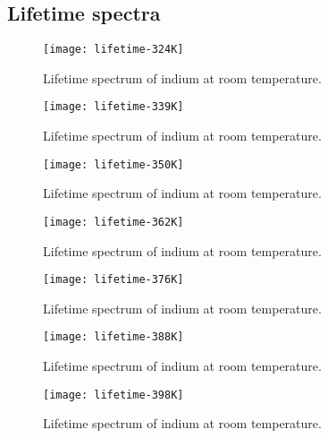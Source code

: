 \documentclass[11pt, english, fleqn, DIV=15, headinclude, BCOR=2cm]{scrreprt}
\begin{document}
\begin{appendix}

    \chapter{Lifetime spectra}

    \begin{figure}
        \centering
        \texttt{[image: lifetime-324K]}
        \caption{%
            Lifetime spectrum of indium at room temperature.
        }
        \label{fig:lifetime-324K}
    \end{figure}

    \begin{figure}
        \centering
        \texttt{[image: lifetime-339K]}
        \caption{%
            Lifetime spectrum of indium at room temperature.
        }
        \label{fig:lifetime-339K}
    \end{figure}

    \begin{figure}
        \centering
        \texttt{[image: lifetime-350K]}
        \caption{%
            Lifetime spectrum of indium at room temperature.
        }
        \label{fig:lifetime-350K}
    \end{figure}

    \begin{figure}
        \centering
        \texttt{[image: lifetime-362K]}
        \caption{%
            Lifetime spectrum of indium at room temperature.
        }
        \label{fig:lifetime-362K}
    \end{figure}

    \begin{figure}
        \centering
        \texttt{[image: lifetime-376K]}
        \caption{%
            Lifetime spectrum of indium at room temperature.
        }
        \label{fig:lifetime-376K}
    \end{figure}

    \begin{figure}
        \centering
        \texttt{[image: lifetime-388K]}
        \caption{%
            Lifetime spectrum of indium at room temperature.
        }
        \label{fig:lifetime-388K}
    \end{figure}

    \begin{figure}
        \centering
        \texttt{[image: lifetime-398K]}
        \caption{%
            Lifetime spectrum of indium at room temperature.
        }
        \label{fig:lifetime-398K}
    \end{figure}

\end{appendix}
\end{document}

